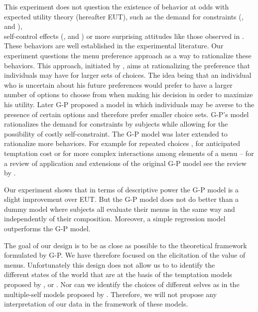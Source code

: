 \documentclass[
]{book}
\begin{document}
This experiment does not question the existence of behavior at odds with expected utility theory (hereafter EUT),
such as the demand for constraints (\citet{chow2011demand}, \citet{gine2010put} and \citet{uhl2011self}),\\
self-control effects (\citet{burger2011field}, \citet{mischel1989delay} and
\citet{kuhn2014self}) or more surprising attitudes like those observed in
\citet{dellavigna2006paying}.
These behaviors are well established in the experimental literature.
Our experiment questions the menu preference approach as a way to rationalize
these behaviors.
This approach, initiated by \citet{kreps1979representation}, aims at rationalizing the
preference that individuals may have for larger sets of choices.
The idea being that an individual who is uncertain about his future preferences
would prefer to have a larger number of options to choose from when making his
decision in order to maximize his utility.
Later G-P proposed a model in which individuals may be averse to the\\
presence of certain options and therefore prefer smaller choice sets.
G-P's model rationalizes the demand for constraints by subjects while allowing
for the possibility of costly self-constraint.
The G-P model was later extended to rationalize more behaviors.
For example \citet{gul2004self} for repeated choices , \citet{noor2010uphill} for anticipated
temptation cost or \citet{noor2015menu} for more complex interactions among elements of
a menu -- for a review of application and extensions of the original G-P model see the review by
\citet{lipman2013temptation}.

Our experiment shows that in terms of descriptive power the G-P model is a
slight improvement over EUT.
But the G-P model does not do better than a dummy model where subjects all evaluate
their menus in the same way and independently of their composition.
Moreover, a simple regression model outperforms the G-P model.

The goal of our design is to be as close as possible to the theoretical
framework formulated by G-P. We have therefore focused on the elicitation of
the value of menus.
Unfortunately this design does not allow us to to identify the\\
different states of the world that are at the basis of the temptation models
proposed by \citet{dekel2001representing}, \citet{dekel2007representing} or
\citet{dekel2009temptation}.
Nor can we identify the choices of different selves as in the multiple-self
models proposed by \citet{fudenberg2006dual}.
Therefore, we will not propose any interpretation of our data in the framework
of these models.
\end{document}
